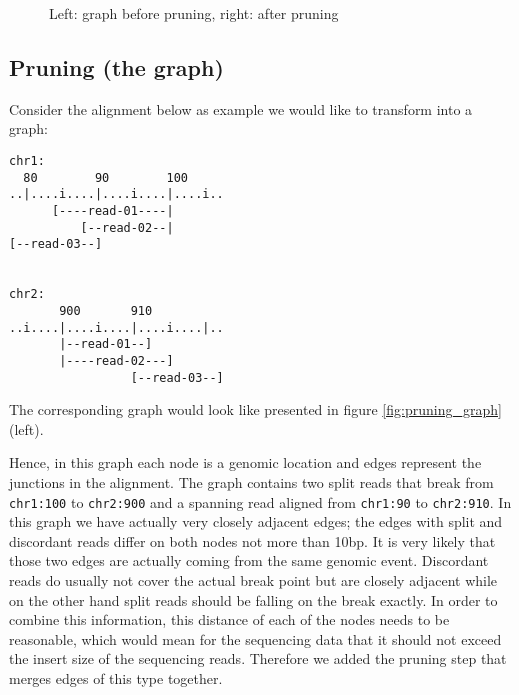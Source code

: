 \documentclass{article}
\theoremstyle{definition}
\begin{document}
\begin{figure}
\caption{Left: graph before pruning, right: after pruning}
\label{fig:edges_clips}
\end{figure}

\clearpage


\subsection{Pruning (the graph)}
Consider the alignment below as example we would like to transform into a graph:
\begin{verbatim}
chr1:
  80        90        100
..|....i....|....i....|....i..
      [----read-01----|
          [--read-02--|
[--read-03--]


chr2:      
       900       910
..i....|....i....|....i....|..
       |--read-01--]
       |----read-02---]
                 [--read-03--]
\end{verbatim}
The corresponding graph would look like presented in figure \ref{fig:pruning_graph} (left).

Hence, in this graph each node is a genomic location and edges represent the junctions in the alignment.
The graph contains two split reads that break from \verb|chr1:100| to \verb|chr2:900| and a spanning read aligned from \verb|chr1:90| to \verb|chr2:910|.
In this graph we have actually very closely adjacent edges; the edges with split and discordant reads differ on both nodes not more than 10bp.
It is very likely that those two edges are actually coming from the same genomic event.
Discordant reads do usually not cover the actual break point but are closely adjacent while on the other hand split reads should be falling on the break exactly.
In order to combine this information, this distance of each of the nodes needs to be reasonable, which would mean for the sequencing data that it should not exceed the insert size of the sequencing reads.
Therefore we added the pruning step that merges edges of this type together.
\end{document}
